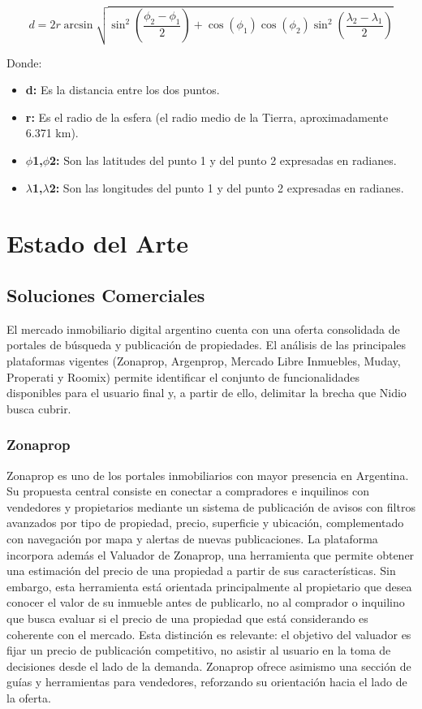 \[
d = 2r\arcsin\sqrt{\sin^2\left(\frac{\phi_2-\phi_1}{2}\right)+\cos(\phi_1)\cos(\phi_2)\sin^2\left(\frac{\lambda_2-\lambda_1}{2}\right)}
\]

Donde:

\begin{itemize}
\item \textbf{d:} Es la distancia entre los dos puntos.
\item \textbf{r:} Es el radio de la esfera (el radio medio de la Tierra, aproximadamente 6.371 km).
\item \textbf{$\phi$1,$\phi$2:} Son las latitudes del punto 1 y del punto 2 expresadas en radianes.
\item \textbf{$\lambda$1,$\lambda$2:} Son las longitudes del punto 1 y del punto 2 expresadas en radianes.
\end{itemize}

\section{Estado del Arte}

\subsection{Soluciones Comerciales}

El mercado inmobiliario digital argentino cuenta con una oferta consolidada de portales de búsqueda y publicación de propiedades. El análisis de las principales plataformas vigentes (Zonaprop, Argenprop, Mercado Libre Inmuebles, Muday, Properati y Roomix) permite identificar el conjunto de funcionalidades disponibles para el usuario final y, a partir de ello, delimitar la brecha que Nidio busca cubrir.

\subsubsection{Zonaprop}

Zonaprop es uno de los portales inmobiliarios con mayor presencia en Argentina. Su propuesta central consiste en conectar a compradores e inquilinos con vendedores y propietarios mediante un sistema de publicación de avisos con filtros avanzados por tipo de propiedad, precio, superficie y ubicación, complementado con navegación por mapa y alertas de nuevas publicaciones. La plataforma incorpora además el Valuador de Zonaprop, una herramienta que permite obtener una estimación del precio de una propiedad a partir de sus características. Sin embargo, esta herramienta está orientada principalmente al propietario que desea conocer el valor de su inmueble antes de publicarlo, no al comprador o inquilino que busca evaluar si el precio de una propiedad que está considerando es coherente con el mercado. Esta distinción es relevante: el objetivo del valuador es fijar un precio de publicación competitivo, no asistir al usuario en la toma de decisiones desde el lado de la demanda. Zonaprop ofrece asimismo una sección de guías y herramientas para vendedores, reforzando su orientación hacia el lado de la oferta.


